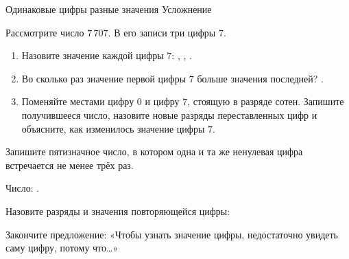 \worksheettitle
  {Одинаковые цифры \textemdash{} разные значения}
  { Усложнение}

\studentnameblock

\begin{problembox}[Исследование]
  Рассмотрите число \(7\,707\). В его записи три цифры \(7\).

  \begin{enumerate}[label=\textbf{\arabic*.}]
    \item Назовите значение каждой цифры \(7\):
      \answerblank[25mm], \answerblank[25mm], \answerblank[25mm].
    \item Во сколько раз значение первой цифры \(7\) больше значения
      последней? \answerblank[20mm].
    \item Поменяйте местами цифру \(0\) и цифру \(7\), стоящую в разряде
      сотен. Запишите получившееся число, назовите новые разряды переставленных
      цифр и объясните, как изменилось значение цифры \(7\).
  \end{enumerate}
\end{problembox}

\begin{practicebox}
  Запишите пятизначное число, в котором одна и та же ненулевая цифра
  встречается не менее трёх раз.

  Число: \answerblank[35mm].

  Назовите разряды и значения повторяющейся цифры:
\end{practicebox}

\begin{reflectionbox}[Обобщение]
  Закончите предложение: «Чтобы узнать значение цифры, недостаточно увидеть
  саму цифру, потому что…»
\end{reflectionbox}
